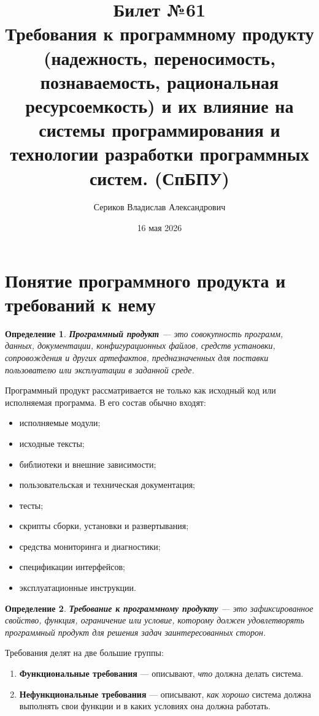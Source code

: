 \documentclass[12pt,a4paper]{article}
\title{Билет №61 \\ \small Требования к программному продукту (надежность, переносимость, познаваемость, рациональная ресурсоемкость) и их влияние на системы программирования и технологии разработки программных систем. (СпБПУ)}
\author{Сериков Владислав Александрович}
\date{16 мая 2026}
\newtheorem{definition}{Определение}
\begin{document}
\maketitle
\tableofcontents
\newpage

\section{Понятие программного продукта и требований к нему}

\begin{definition}
\textbf{Программный продукт} --- это совокупность программ, данных, документации, конфигурационных файлов, средств установки, сопровождения и других артефактов, предназначенных для поставки пользователю или эксплуатации в заданной среде.
\end{definition}

Программный продукт рассматривается не только как исходный код или исполняемая программа. В его состав обычно входят:
\begin{itemize}
    \item исполняемые модули;
    \item исходные тексты;
    \item библиотеки и внешние зависимости;
    \item пользовательская и техническая документация;
    \item тесты;
    \item скрипты сборки, установки и развертывания;
    \item средства мониторинга и диагностики;
    \item спецификации интерфейсов;
    \item эксплуатационные инструкции.
\end{itemize}

\begin{definition}
\textbf{Требование к программному продукту} --- это зафиксированное свойство, функция, ограничение или условие, которому должен удовлетворять программный продукт для решения задач заинтересованных сторон.
\end{definition}

Требования делят на две большие группы:
\begin{enumerate}
    \item \textbf{Функциональные требования} --- описывают, \emph{что} должна делать система.
    \item \textbf{Нефункциональные требования} --- описывают, \emph{как хорошо} система должна выполнять свои функции и в каких условиях она должна работать.
\end{enumerate}
\end{document}
